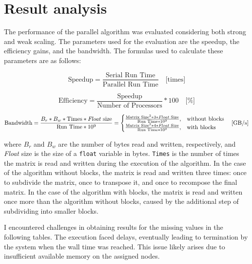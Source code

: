 \section*{Result analysis}

The performance of the parallel algorithm was evaluated considering both strong and weak scaling. %
The parameters used for the evaluation are the speedup, the efficiency gains, and the bandwidth. The formulas %
used to calculate these parameters are as follows:

\begin{equation}
    \label{eq:speedup}
    \text{Speedup} = \frac{\text{Serial Run Time}}{\text{Parallel Run Time}} \quad \text{[times]}
\end{equation}

\begin{equation}
    \label{eq:efficiency}
    \text{Efficiency} = \frac{\text{Speedup}}{\text{Number of Processors}} * 100 \quad \text{[\%]}
\end{equation}

\begin{equation}
    \label{eq:bandwidth}
    \text{Bandwidth} = \frac{B_r * B_w * \text{Times} * \text{\textit{Float} size}}{\text{Run Time} * 10^9} = 
    \begin{cases}
        \frac{\text{Matrix Size}^2 * 3 * \text{\textit{Float} Size}}{\text{Run Time} * 10^9}, & \text{without blocks}\\
        \frac{\text{Matrix Size}^2 * 4 * \text{\textit{Float} Size}}{\text{Run Time} * 10^9}, & \text{with blocks}
    \end{cases} \quad
    \text{[GB/s]}
\end{equation}

where $B_r$ and $B_w$ are the number of bytes read and written, respectively, and \textit{Float} size is the size of a %
\texttt{float} variable in bytes. \texttt{Times} is the number of times the matrix is read and written during the execution %
of the algorithm. In the case of the algorithm without blocks, the matrix is read and written three times: once to subdivide %
the matrix, once to transpose it, and once to recompose the final matrix. In the case of the algorithm with blocks, the matrix %
is read and written once more than the algorithm without blocks, caused by the additional step of subdividing into smaller blocks.

I encountered challenges in obtaining results for the missing values in the following tables. The execution faced delays, eventually %
leading to termination by the system when the wall time was reached. This issue likely arises due to insufficient available memory %
on the assigned nodes.

